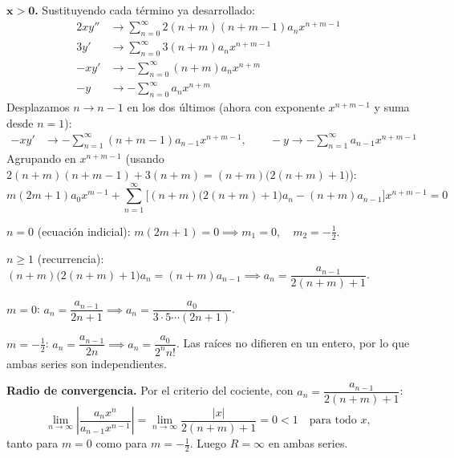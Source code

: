 \documentclass[11pt, a4paper]{article}
\begin{document}
\vspace{0.2cm}\noindent\textbf{ $\bm{x>0}$.} Sustituyendo cada término ya desarrollado:
\begin{align*}
2xy'' &\to \sum_{n=0}^\infty 2(n+m)(n+m-1)a_nx^{n+m-1} \\
3y' &\to \sum_{n=0}^\infty 3(n+m)a_nx^{n+m-1} \\
-xy' &\to -\sum_{n=0}^\infty (n+m)a_nx^{n+m} \\
-y &\to -\sum_{n=0}^\infty a_nx^{n+m}
\end{align*}
Desplazamos $n\to n-1$ en los dos últimos (ahora con exponente $x^{n+m-1}$ y suma desde $n=1$):
\begin{align*}
-xy' &\to -\sum_{n=1}^\infty (n+m-1)a_{n-1}x^{n+m-1}, \qquad -y \to -\sum_{n=1}^\infty a_{n-1}x^{n+m-1}
\end{align*}
Agrupando en $x^{n+m-1}$ (usando $2(n+m)(n+m-1)+3(n+m)=(n+m)\big(2(n+m)+1\big)$):
\[
m(2m+1)a_0x^{m-1}+\sum_{n=1}^\infty\Big[(n+m)\big(2(n+m)+1\big)a_n-(n+m)a_{n-1}\Big]x^{n+m-1}=0
\]

\smallskip\noindent $n=0$ (ecuación indicial): $m(2m+1)=0 \implies m_1=0,\quad m_2=-\tfrac12$.

\smallskip\noindent $n\geq1$ (recurrencia): $(n+m)\big(2(n+m)+1\big)a_n=(n+m)a_{n-1} \implies a_n=\dfrac{a_{n-1}}{2(n+m)+1}$.

\smallskip\noindent $m=0$: $a_n=\dfrac{a_{n-1}}{2n+1} \implies a_n=\dfrac{a_0}{3\cdot5\cdots(2n+1)}$.

\smallskip\noindent $m=-\tfrac12$: $a_n=\dfrac{a_{n-1}}{2n} \implies a_n=\dfrac{a_0}{2^nn!}$.
Las raíces no difieren en un entero, por lo que ambas series son independientes.

\smallskip\noindent\textbf{Radio de convergencia.} Por el criterio del cociente, con $a_n=\dfrac{a_{n-1}}{2(n+m)+1}$:
\[
\lim_{n\to\infty}\left|\frac{a_{n}x^{n}}{a_{n-1}x^{n-1}}\right|=\lim_{n\to\infty}\frac{|x|}{2(n+m)+1}=0<1 \quad\text{para todo }x,
\]
tanto para $m=0$ como para $m=-\tfrac12$. Luego $R=\infty$ en ambas series.
\end{document}

